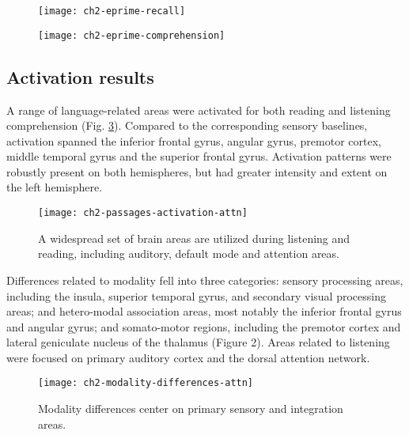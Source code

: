 \begin{figure}[tp]
	\centering
	\texttt{[image: ch2-eprime-recall]}
    \caption[Post-scanner recall was not related to modality.]{}
	\label{fig:ch2-eprime-recall}
\end{figure}

\begin{figure}[tp]
	\centering
	\texttt{[image: ch2-eprime-comprehension]}
    \caption[In-scanner comprehension performance did not differ by modality.]{}
	\label{fig:ch2-eprime-comprehension}
\end{figure}


\subsection{Activation results}

A range of language-related areas were activated for both reading and listening comprehension (Fig. \ref{fig:ch2-passages-activation-attn}). Compared to the corresponding sensory baselines, activation spanned the inferior frontal gyrus, angular gyrus, premotor cortex, middle temporal gyrus and the superior frontal gyrus. Activation patterns were robustly present on both hemispheres, but had greater intensity and extent on the left hemisphere. 

\begin{figure}[tp]
	\centering
	\texttt{[image: ch2-passages-activation-attn]}
    \caption[There is significant overlap between the areas used in listening and reading.]{A widespread set of brain areas are utilized during listening and reading, including auditory, default mode and attention areas.}
	\label{fig:ch2-passages-activation-attn}
\end{figure}

Differences related to modality fell into three categories: sensory processing areas, including the insula, superior temporal gyrus, and secondary visual processing areas; and hetero-modal association areas, most notably the inferior frontal gyrus and angular gyrus; and somato-motor regions, including the premotor cortex and lateral geniculate nucleus of the thalamus (Figure 2). Areas related to listening were focused on primary auditory cortex and the dorsal attention network. 

\begin{figure}[!b]
	\centering
	\texttt{[image: ch2-modality-differences-attn]}
    \caption[Modality differences center on primary sensory and integration areas.]{Modality differences center on primary sensory and integration areas.}
	\label{fig:ch2-modality-differences-attn}
\end{figure}

